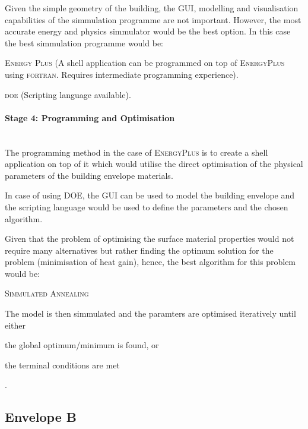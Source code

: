 Given the simple geometry of the building, the GUI, modelling and  visualisation capabilities of the simmulation programme are not important. However, the most accurate energy and physics simmulator would be the best option. In this case the best simmulation programme would be:

\begin{compactenum}
	\item \textsc{Energy Plus} (A shell application can be programmed on top of \textsc{EnergyPlus} using \textsc{fortran}. Requires intermediate programming experience).
	\item \textsc{doe} (Scripting language available).
\end{compactenum}

\paragraph{Stage 4: Programming and Optimisation}\mbox{}\\

The programming method in the case of \textsc{EnergyPlus} is to create a shell application on top of it which would utilise the direct optimisation of the physical parameters of the building envelope materials.

In case of using \textsc{DOE}, the GUI can be used to model the building envelope and the scripting language would be used to define the parameters and the chosen algorithm.

Given that the problem of optimising the surface material properties would not require many alternatives but rather finding the optimum solution for the problem (minimisation of heat gain), hence, the best algorithm for this problem would be:

\begin{compactenum}
\item \textsc{Simmulated Annealing}
\end{compactenum}

The model is then simmulated and the paramters are optimised iteratively until either \begin{inparaenum}[a)]\item the global optimum/minimum is found, or \item the terminal conditions are met\end{inparaenum}.

\clearpage
\subsection{Envelope B}


